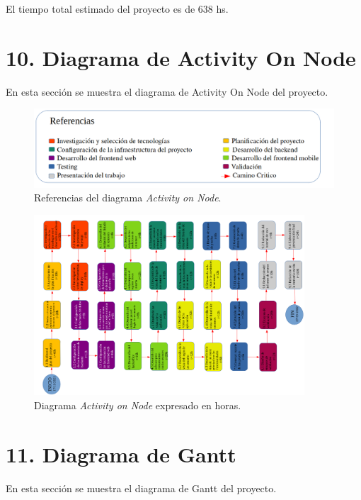 \documentclass[
11pt, %
]{charter}
\begin{document}
El tiempo total estimado del proyecto es de 638 hs.


\section{10. Diagrama de Activity On Node}
\label{sec:AoN}

En esta sección se muestra el diagrama de Activity On Node del proyecto.

\begin{figure}[htpb]
\centering 
\includegraphics[width=1\textwidth]{./Figuras/referencias_aon.png}
\caption{Referencias del diagrama \textit{Activity on Node}.}
\label{fig:AoN_referencias}
\end{figure}


\begin{figure}[htpb]
\centering 
\includegraphics[angle=270,width=0.9\textwidth]{./Figuras/aon.png}
\caption{Diagrama \textit{Activity on Node} expresado en horas.}
\label{fig:AoN}
\end{figure}


\section{11. Diagrama de Gantt}
\label{sec:gantt}

En esta sección se muestra el diagrama de Gantt del proyecto.
\end{document}

